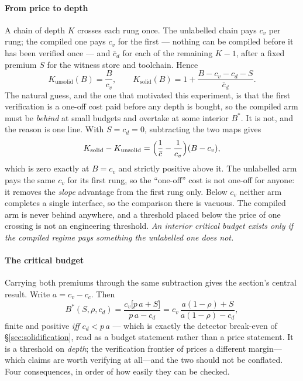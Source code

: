 \documentclass[conference]{IEEEtran}
\theoremstyle{definition}
\begin{document}
\paragraph{From price to depth} A chain of depth $K$ crosses each rung once. The
unlabelled chain pays $c_v$ per rung; the compiled one pays $c_v$ for the first ---
nothing can be compiled before it has been verified once --- and $\bar c_d$ for each
of the remaining $K-1$, after a fixed premium $S$ for the witness store and
toolchain. Hence
\begin{equation}
K_{\text{unsolid}}(B)=\frac{B}{c_v},
\qquad
K_{\text{solid}}(B)=1+\frac{B-c_v-c_d-S}{\bar c_d}.
\label{eq:cbdepth}
\end{equation}
The natural guess, and the one that motivated this experiment, is that the first
verification is a one-off cost paid before any depth is bought, so the compiled arm
must be \emph{behind} at small budgets and overtake at some interior $B^{*}$. It is
not, and the reason is one line. With $S=c_d=0$, subtracting the two maps gives
\begin{equation}
K_{\text{solid}}-K_{\text{unsolid}}
=\Bigl(\frac{1}{\bar c}-\frac{1}{c_v}\Bigr)(B-c_v),
\label{eq:cbdegenerate}
\end{equation}
which is zero exactly at $B=c_v$ and strictly positive above it. The unlabelled arm
pays the same $c_v$ for its first rung, so the ``one-off'' cost is not one-off for
anyone: it removes the \emph{slope} advantage from the first rung only. Below $c_v$
neither arm completes a single interface, so the comparison there is vacuous. The
compiled arm is never behind anywhere, and a threshold placed below the price of one
crossing is not an engineering threshold. \emph{An interior critical budget exists
only if the compiled regime pays something the unlabelled one does not.}

\paragraph{The critical budget} Carrying both premiums through the same subtraction
gives the section's central result. Write $a=c_v-c_c$. Then
\begin{equation}
B^{*}(S,\rho,c_d)
=\frac{c_v\bigl[p\,a+S\bigr]}{p\,a-c_d}
=c_v\,\frac{a(1-\rho)+S}{a(1-\rho)-c_d},
\label{eq:cbstar}
\end{equation}
finite and positive \emph{iff} $c_d<p\,a$ --- which is exactly the detector
break-even of \S\ref{sec:solidification}, read as a budget statement rather than a
price statement. It is a threshold on \emph{depth}; the verification frontier of
\cite{gill2026} prices a different margin---which claims are worth verifying at
all---and the two should not be conflated. Four consequences, in order of how
easily they can be checked.
\end{document}
